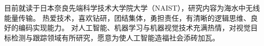 

\begin{cvparagraph}

目前就读于日本奈良先端科学技术大学院大学（NAIST），研究内容为海水中无线能量传输。
热爱技术，喜欢钻研，团结集体，勇担责任，有清晰的逻辑思维、良好的编码实现能力。
对人工智能、机器学习与机器视觉技术充满热情，对视觉目标检测与跟踪领域有所研究，愿意为使人工智能造福社会添砖加瓦。
\end{cvparagraph}